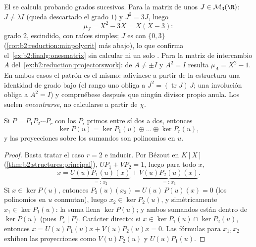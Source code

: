 \begin{example}\label{ex:b2:reduction:minpolyhand}
El  se calcula probando grados sucesivos. Para
la matriz de unos $J \in \mathcal{M}_3(\R)$: $J \neq \lambda I$
(queda descartado el grado $1$) y $J^2 = 3J$, luego
\[
\mu_J = X^2 - 3X = X(X - 3) :
\]
grado $2$, escindido, con raíces simples; $J$ es 
con  $\{0, 3\}$ (\cref{cor:b2:reduction:minpolycrit} más
abajo), lo que confirma el~\cref{ex:b2:linalg:onesmatrix} sin
calcular ni un solo . Para la matriz de intercambio $A$
del~\cref{ex:b2:reduction:projectorswork}: de $A \neq \pm I$ y $A^2
= I$ resulta $\mu_A = X^2 - 1$. En ambos casos el patrón es el
mismo: adivínese a partir de la estructura una identidad de grado
bajo (el rango uno obliga a $J^2 = (\operatorname{tr}J)\,J$; una
involución obliga a $A^2 = I$) y compruébese después que ningún
divisor propio anula. Los  suelen
\emph{encontrarse}, no calcularse a partir de $\chi$.
\end{example}

\begin{theorem}\label{thm:b2:reduction:kernels}
Si $P = P_1 P_2 \cdots P_r$ con los $P_i$ primos entre sí dos a dos,
entonces
\[
\ker P(u) = \ker P_1(u) \oplus \dots \oplus \ker P_r(u),
\]
y las proyecciones sobre los sumandos son polinomios en $u$.
\end{theorem}

\begin{proof}
Basta tratar el caso $r = 2$ e inducir. Por Bézout en $K[X]$
(\cref{thm:b2:structures:principal}), $U P_1 + V P_2 = 1$, luego para
todo $x$,
\[
x = \underbrace{U(u)P_1(u)(x)}_{=:\,x_2}
+ \underbrace{V(u)P_2(u)(x)}_{=:\,x_1}.
\]
Si $x \in \ker P(u)$, entonces $P_2(u)(x_2) = U(u)\,P(u)(x) = 0$ (los
polinomios en $u$ conmutan), luego $x_2 \in \ker P_2(u)$, y
simétricamente $x_1 \in \ker P_1(u)$: la suma llena $\ker P(u)$; y
ambos sumandos están dentro de $\ker P(u)$ (pues $P_i \mid P$).
Carácter directo: si $x \in \ker P_1(u) \cap \ker P_2(u)$, entonces
$x = U(u)P_1(u)x + V(u)P_2(u)x = 0$. Las fórmulas para $x_1, x_2$
exhiben las proyecciones como $V(u)P_2(u)$ y $U(u)P_1(u)$.
\end{proof}

